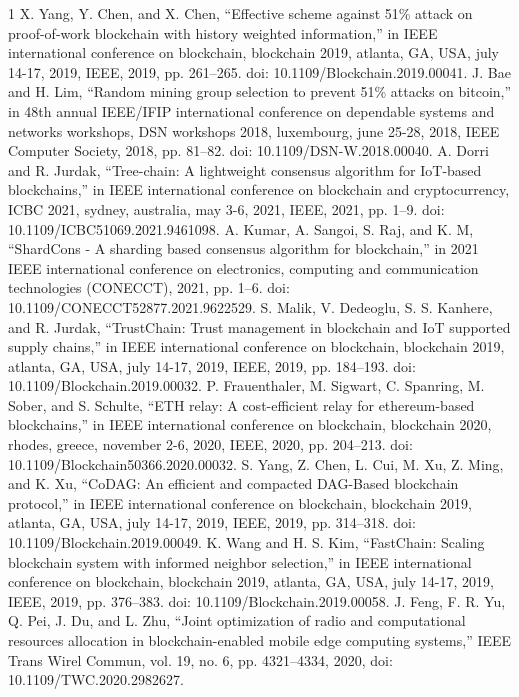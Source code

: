 \documentclass[lettersize,journal]{IEEEtran}
\begin{document}
\begin{thebibliography}{1}
\bibitem{}X. Yang, Y. Chen, and X. Chen, “Effective scheme against 51\% attack on proof-of-work blockchain with history weighted information,” in IEEE international conference on blockchain, blockchain 2019, atlanta, GA, USA, july 14-17, 2019, IEEE, 2019, pp. 261–265. doi: 10.1109/Blockchain.2019.00041.
\bibitem{}J. Bae and H. Lim, “Random mining group selection to prevent 51\% attacks on bitcoin,” in 48th annual IEEE/IFIP international conference on dependable systems and networks workshops, DSN workshops 2018, luxembourg, june 25-28, 2018, IEEE Computer Society, 2018, pp. 81–82. doi: 10.1109/DSN-W.2018.00040.
\bibitem{}A. Dorri and R. Jurdak, “Tree-chain: A lightweight consensus algorithm for IoT-based blockchains,” in IEEE international conference on blockchain and cryptocurrency, ICBC 2021, sydney, australia, may 3-6, 2021, IEEE, 2021, pp. 1–9. doi: 10.1109/ICBC51069.2021.9461098.
\bibitem{}A. Kumar, A. Sangoi, S. Raj, and K. M, “ShardCons - A sharding based consensus algorithm for blockchain,” in 2021 IEEE international conference on electronics, computing and communication technologies (CONECCT), 2021, pp. 1–6. doi: 10.1109/CONECCT52877.2021.9622529.
\bibitem{}S. Malik, V. Dedeoglu, S. S. Kanhere, and R. Jurdak, “TrustChain: Trust management in blockchain and IoT supported supply chains,” in IEEE international conference on blockchain, blockchain 2019, atlanta, GA, USA, july 14-17, 2019, IEEE, 2019, pp. 184–193. doi: 10.1109/Blockchain.2019.00032.
\bibitem{}P. Frauenthaler, M. Sigwart, C. Spanring, M. Sober, and S. Schulte, “ETH relay: A cost-efficient relay for ethereum-based blockchains,” in IEEE international conference on blockchain, blockchain 2020, rhodes, greece, november 2-6, 2020, IEEE, 2020, pp. 204–213. doi: 10.1109/Blockchain50366.2020.00032.
\bibitem{}S. Yang, Z. Chen, L. Cui, M. Xu, Z. Ming, and K. Xu, “CoDAG: An efficient and compacted DAG-Based blockchain protocol,” in IEEE international conference on blockchain, blockchain 2019, atlanta, GA, USA, july 14-17, 2019, IEEE, 2019, pp. 314–318. doi: 10.1109/Blockchain.2019.00049.
\bibitem{}K. Wang and H. S. Kim, “FastChain: Scaling blockchain system with informed neighbor selection,” in IEEE international conference on blockchain, blockchain 2019, atlanta, GA, USA, july 14-17, 2019, IEEE, 2019, pp. 376–383. doi: 10.1109/Blockchain.2019.00058.
\bibitem{}J. Feng, F. R. Yu, Q. Pei, J. Du, and L. Zhu, “Joint optimization of radio and computational resources allocation in blockchain-enabled mobile edge computing systems,” IEEE Trans Wirel Commun, vol. 19, no. 6, pp. 4321–4334, 2020, doi: 10.1109/TWC.2020.2982627.

\end{thebibliography}
\end{document}
